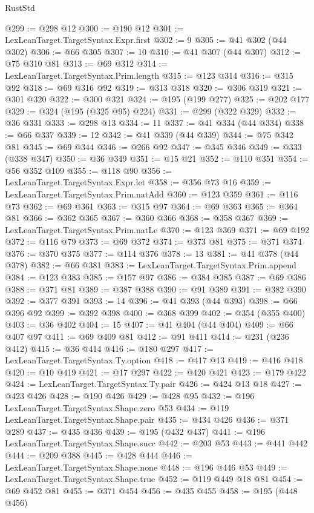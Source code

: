 \begin{lexlean}{RustStd}
\begin{coremodule}
{\begin{coremodule}
{{{{{{{{{{{{{{{{{{{{{{{{{{{{{{@299 := @298 @12
@300 := @190 @12
@301 := LexLeanTarget.TargetSyntax.Expr.first
@302 := 9
@305 := @41 @302 (@44 @302)
@306 := @66 @305
@307 := 10
@310 := @41 @307 (@44 @307)
@312 := @75 @310 @81
@313 := @69 @312
@314 := LexLeanTarget.TargetSyntax.Prim.length
@315 := @123 @314
@316 := @315 @92
@318 := @69 @316 @92
@319 := @313 @318
@320 := @306 @319
@321 := @301 @320
@322 := @300 @321
@324 := @195 (@199 @277)
@325 := @202 @177
@329 := @324 (@195 (@325 @95) @224)
@331 := @299 (@322 @329)
@332 := @36 @331
@333 := @298 @13
@334 := 11
@337 := @41 @334 (@44 @334)
@338 := @66 @337
@339 := 12
@342 := @41 @339 (@44 @339)
@344 := @75 @342 @81
@345 := @69 @344
@346 := @266 @92
@347 := @345 @346
@349 := @333 (@338 @347)
@350 := @36 @349
@351 := @15 @21
@352 := @110 @351
@354 := @56 @352 @109
@355 := @118 @90
@356 := LexLeanTarget.TargetSyntax.Expr.let
@358 := @356 @73 @16
@359 := LexLeanTarget.TargetSyntax.Prim.natAdd
@360 := @123 @359
@361 := @116 @73
@362 := @69 @361
@363 := @315 @97
@364 := @69 @363
@365 := @364 @81
@366 := @362 @365
@367 := @360 @366
@368 := @358 @367
@369 := LexLeanTarget.TargetSyntax.Prim.natLe
@370 := @123 @369
@371 := @69 @192
@372 := @116 @79
@373 := @69 @372
@374 := @373 @81
@375 := @371 @374
@376 := @370 @375
@377 := @114 @376
@378 := 13
@381 := @41 @378 (@44 @378)
@382 := @66 @381
@383 := LexLeanTarget.TargetSyntax.Prim.append
@384 := @123 @383
@385 := @157 @97
@386 := @384 @385
@387 := @69 @386
@388 := @371 @81
@389 := @387 @388
@390 := @91 @389
@391 := @382 @390
@392 := @377 @391
@393 := 14
@396 := @41 @393 (@44 @393)
@398 := @66 @396 @92
@399 := @392 @398
@400 := @368 @399
@402 := @354 (@355 @400)
@403 := @36 @402
@404 := 15
@407 := @41 @404 (@44 @404)
@409 := @66 @407 @97
@411 := @69 @409 @81
@412 := @91 @411
@414 := @231 (@236 @412)
@415 := @36 @414
@416 := @180 @297
@417 := LexLeanTarget.TargetSyntax.Ty.option
@418 := @417 @13
@419 := @416 @418
@420 := @10 @419
@421 := @17 @297
@422 := @420 @421
@423 := @179 @422
@424 := LexLeanTarget.TargetSyntax.Ty.pair
@426 := @424 @13 @18
@427 := @423 @426
@428 := @190 @426
@429 := @428 @95
@432 := @196 LexLeanTarget.TargetSyntax.Shape.zero @53
@434 := @119 LexLeanTarget.TargetSyntax.Shape.pair
@435 := @434 @426
@436 := @371 @289
@437 := @435 @436
@439 := @195 (@432 @437)
@441 := @196 LexLeanTarget.TargetSyntax.Shape.succ
@442 := @203 @53
@443 := @441 @442
@444 := @209 @388
@445 := @428 @444
@446 := LexLeanTarget.TargetSyntax.Shape.none
@448 := @196 @446 @53
@449 := LexLeanTarget.TargetSyntax.Shape.true
@452 := @119 @449 @18 @81
@454 := @69 @452 @81
@455 := @371 @454
@456 := @435 @455
@458 := @195 (@448 @456)
}}}}}}}}}}}}}}}}}}}}}}}}}}}}}}
\end{coremodule}}
\end{coremodule}
\end{lexlean}
